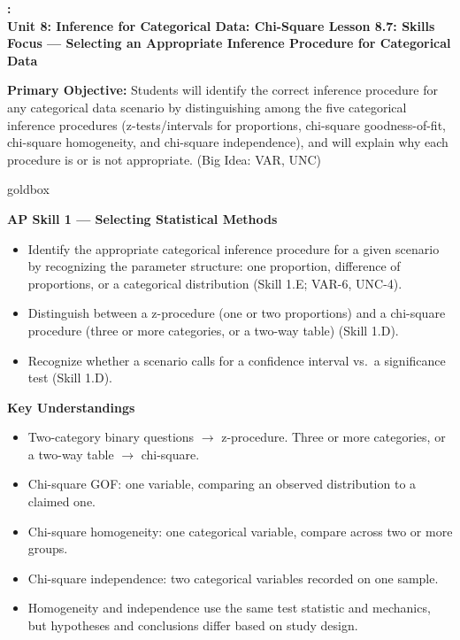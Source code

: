 \documentclass[10pt]{article}
\newcommand{\UnitNumberName}{Unit 8: Inference for Categorical Data: Chi-Square \quad}
\newcommand{\LessonNumberName}{Lesson 8.7: Skills Focus --- Selecting an Appropriate Inference Procedure for Categorical Data}
\begin{document}
\begin{center}
    {\Large\bfseries \CourseName: \SchoolYear \\
    {\small\bfseries \UnitNumberName \LessonNumberName}}
\end{center}

\begin{tcolorbox}[colback=sky, colframe=navy, boxrule=0.9pt, arc=2mm,
    left=2mm, right=2mm, top=1.5mm, bottom=1.5mm]
    \textbf{Primary Objective:} Students will identify the correct inference procedure for any
    categorical data scenario by distinguishing among the five categorical inference procedures
    (z-tests/intervals for proportions, chi-square goodness-of-fit, chi-square homogeneity, and
    chi-square independence), and will explain why each procedure is or is not appropriate.
    (Big Idea: VAR, UNC)
\end{tcolorbox}

\renewcommand{\arraystretch}{1.6}
\begin{skillbox}{goldbox}
\begin{minipage}[t]{0.48\linewidth}
    \textbf{AP Skill 1 --- Selecting Statistical Methods}
    \begin{itemize}
        \item Identify the appropriate categorical inference procedure for a given scenario
              by recognizing the parameter structure: one proportion, difference of proportions,
              or a categorical distribution (Skill 1.E; VAR-6, UNC-4).
        \item Distinguish between a z-procedure (one or two proportions) and a chi-square
              procedure (three or more categories, or a two-way table) (Skill 1.D).
        \item Recognize whether a scenario calls for a confidence interval vs.\
              a significance test (Skill 1.D).
    \end{itemize}
\end{minipage}
\hfill
\begin{minipage}[t]{0.48\linewidth}
    \textbf{Key Understandings}
    \begin{itemize}
        \item Two-category binary questions $\to$ z-procedure. Three or more categories, or a
              two-way table $\to$ chi-square.
        \item Chi-square GOF: one variable, comparing an observed distribution to a claimed one.
        \item Chi-square homogeneity: one categorical variable, compare across two or more groups.
        \item Chi-square independence: two categorical variables recorded on one sample.
        \item Homogeneity and independence use the same test statistic and mechanics, but
              hypotheses and conclusions differ based on study design.
    \end{itemize}
\end{minipage}
\end{skillbox}
\end{document}

